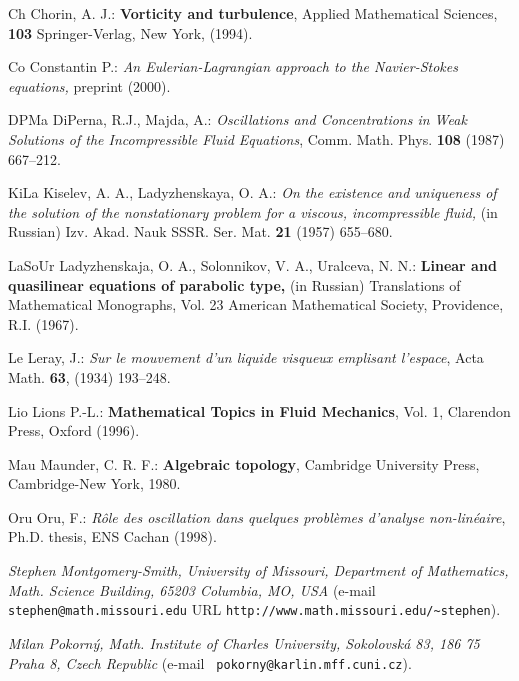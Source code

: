 \documentclass[12pt,twoside]{article}
\begin{document}
\begin{thebibliography}{99}

\bibitem
{Ch} Chorin, A. J.: {\bf Vorticity and turbulence}, 
Applied Mathematical Sciences, {\bf 103} Springer-Verlag, New York,
(1994). 

\bibitem
{Co} Constantin P.: {\it An Eulerian-Lagrangian approach to the
Navier-Stokes equations,} 
preprint (2000).

\bibitem
{DPMa} DiPerna, R.J., Majda, A.: {\it Oscillations and Concentrations in
Weak Solutions of the Incompressible Fluid Equations}, Comm. Math. Phys.
{\bf 108} (1987) 667--212.

\bibitem
{KiLa} Kiselev, A. A., Ladyzhenskaya, O. A.: {\it 
On the existence and uniqueness of the solution of the nonstationary
problem for a viscous, incompressible fluid,} (in Russian) 
Izv. Akad. Nauk SSSR. Ser. Mat. {\bf 21} (1957) 655--680.

\bibitem
{LaSoUr} Ladyzhenskaja, O. A., Solonnikov, V. A., Uralceva, N. N.: 
{\bf Linear and quasilinear equations of parabolic
type,} (in Russian) Translations of Mathematical Monographs, Vol. 23 
American Mathematical Society, Providence, R.I. (1967). 

\bibitem
{Le} Leray, J.: {\it Sur le mouvement d'un liquide visqueux emplisant 
l'espace},  Acta Math. {\bf 63},
(1934) 193--248.

\bibitem
{Lio} Lions P.-L.: {\bf Mathematical Topics in Fluid Mechanics}, 
Vol. 1, Clarendon Press, Oxford (1996).

\bibitem
{Mau} Maunder, C. R. F.: {\bf Algebraic topology}, 
Cambridge University Press, Cambridge-New York, 1980.

\bibitem
{Oru} Oru, F.: {\it R\^ole des oscillation dans quelques
probl\`emes d'analyse non-lin\'eaire},
Ph.D. thesis, ENS Cachan (1998). 
\end{thebibliography}

\noindent
{\it Stephen Montgomery-Smith, University of Missouri,
Department of Mathematics,  Math. Science Building, 65203 Columbia, MO,
USA} \newline (e-mail {\tt stephen@math.missouri.edu}
\newline
URL {\tt http://www.math.missouri.edu/\~{}stephen}).

\medskip
\noindent
{\it Milan Pokorn\'{y}, Math. Institute of Charles University, 
Sokolovsk\'a 83, 186 75 Praha 8, Czech Republic} \newline (e-mail {\tt
pokorny@karlin.mff.cuni.cz}).
\end{document}
